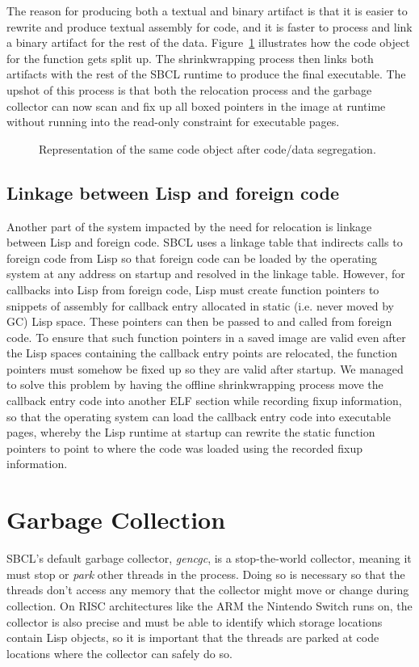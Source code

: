 \documentclass[format=sigconf]{acmart}
\begin{document}
The reason for producing both a textual and binary artifact is that it is easier to rewrite and produce textual assembly for code, and it is faster to process and link a binary artifact for the rest of the data. Figure~\ref{fig:after-shrinkwrap} illustrates how the code object for the function  gets split up. The shrinkwrapping process then links both artifacts with the rest of the SBCL runtime to produce the final executable. The upshot of this process is that both the relocation process and the garbage collector can now scan and fix up all boxed pointers in the image at runtime without running into the read-only constraint for executable pages.

\begin{figure}[h]
  \label{fig:after-shrinkwrap}
  \centering
  
  \caption{Representation of the same code object after code/data
    segregation.}
\end{figure}

\subsection{Linkage between Lisp and foreign code}
Another part of the system impacted by the need for relocation is linkage between Lisp and foreign code. SBCL uses a linkage table that indirects calls to foreign code from Lisp so that foreign code can be loaded by the operating system at any address on startup and resolved in the linkage table. However, for callbacks into Lisp from foreign code, Lisp must create function pointers to snippets of assembly for callback entry allocated in static (i.e. never moved by GC) Lisp space. These pointers can then be passed to and called from foreign code. To ensure that such function pointers in a saved image are valid even after the Lisp spaces containing the callback entry points are relocated, the function pointers must somehow be fixed up so they are valid after startup. We managed to solve this problem by having the offline shrinkwrapping process move the callback entry code into another  ELF section while recording fixup information, so that the operating system can load the callback entry code into executable pages, whereby the Lisp runtime at startup can rewrite the static function pointers to point to where the code was loaded using the recorded fixup information.

\section{Garbage Collection}\label{gc}
SBCL's default garbage collector, \textit{gencgc}, is a stop-the-world collector, meaning it must stop or \textit{park} other threads in the process. Doing so is necessary so that the threads don't access any memory that the collector might move or change during collection. On RISC architectures like the ARM the Nintendo Switch runs on, the collector is also precise and must be able to identify which storage locations contain Lisp objects, so it is important that the threads are parked at code locations where the collector can safely do so.
\end{document}

